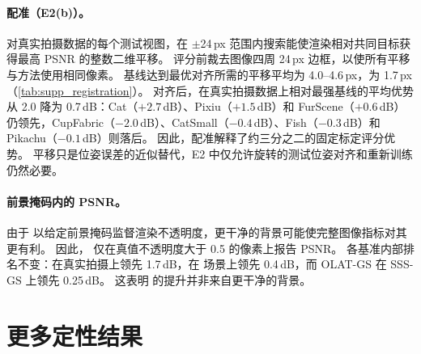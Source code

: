 \documentclass[10pt,twocolumn,letterpaper]{article}
\begin{document}
\paragraph{配准（E2(b)）。}
对真实拍摄数据的每个测试视图，在 $\pm$24\,px 范围内搜索能使渲染相对共同目标获得最高 PSNR 的整数二维平移。
评分前裁去图像四周 24\,px 边框，以使所有平移与方法使用相同像素。
基线达到最优对齐所需的平移平均为 4.0--4.6\,px，\ours 为 1.7\,px（\cref{tab:supp_registration}）。
对齐后，\ours 在真实拍摄数据上相对最强基线的平均优势从 2.0 降为 0.7\,dB：Cat（$+2.7$\,dB）、Pixiu（$+1.5$\,dB）和 FurScene（$+0.6$\,dB）仍领先，CupFabric（$-2.0$\,dB）、CatSmall（$-0.4$\,dB）、Fish（$-0.3$\,dB）和 Pikachu（$-0.1$\,dB）则落后。
因此，配准解释了约三分之二的固定标定评分优势。
平移只是位姿误差的近似替代，E2 中仅允许旋转的测试位姿对齐和重新训练仍然必要。



\paragraph{前景掩码内的 PSNR。}
由于 \ours 以给定前景掩码监督渲染不透明度，更干净的背景可能使完整图像指标对其更有利。
因此， 仅在真值不透明度大于 0.5 的像素上报告 PSNR。
各基准内部排名不变：\ours 在真实拍摄上领先 1.7\,dB，在 \gsthree 场景上领先 0.4\,dB，而 OLAT-GS 在 SSS-GS 上领先 0.25\,dB。
这表明 \ours 的提升并非来自更干净的背景。



\section{更多定性结果}
\label{sec:s_qual}
\end{document}
